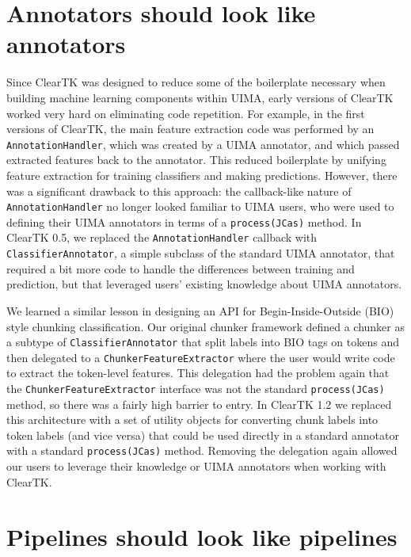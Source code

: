 \documentclass[10pt, a4paper]{article}
\newcommand{\code}[1]{\texttt{\small #1}}
\begin{document}
\section{Annotators should look like annotators}
Since ClearTK was designed to reduce some of the boilerplate necessary when building machine learning components within UIMA, early versions of ClearTK worked very hard on eliminating code repetition.
For example, in the first versions of ClearTK, the main feature extraction code was performed by an \code{AnnotationHandler}, which was created by a UIMA annotator, and which passed extracted features back to the annotator.
This reduced boilerplate by unifying feature extraction for training classifiers and making predictions.
However, there was a significant drawback to this approach:
the callback-like nature of \code{AnnotationHandler} no longer looked familiar to UIMA users, who were used to defining their UIMA annotators in terms of a \code{process(JCas)} method.
In ClearTK 0.5, we replaced the \code{AnnotationHandler} callback with \code{ClassifierAnnotator}, a simple subclass of the standard UIMA annotator, that required a bit more code to handle the differences between training and prediction, but that leveraged users' existing knowledge about UIMA annotators.

We learned a similar lesson in designing an API for Begin-Inside-Outside (BIO) style chunking classification.
Our original chunker framework defined a chunker as a subtype of \code{ClassifierAnnotator} that split labels into BIO tags on tokens and then delegated to a \code{ChunkerFeatureExtractor} where the user would write code to extract the token-level features.
This delegation had the problem again that the \code{ChunkerFeatureExtractor} interface was not the standard \code{process(JCas)} method, so there was a fairly high barrier to entry.
In ClearTK 1.2 we replaced this architecture with a set of utility objects for converting chunk labels into token labels (and vice versa) that could be used directly in a standard annotator with a standard \code{process(JCas)} method.
Removing the delegation again allowed our users to leverage their knowledge or UIMA annotators when working with ClearTK.


\section{Pipelines should look like pipelines}
\end{document}
